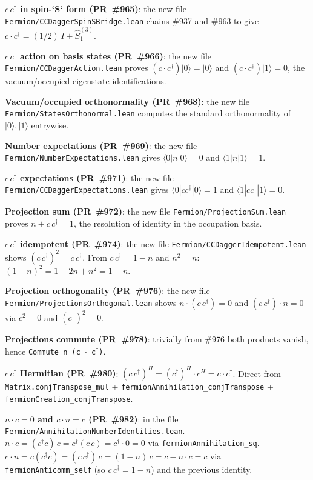 \documentclass[a4paper,11pt]{article}
\begin{document}
\textbf{$c\,c^\dagger$ in spin-`S` form (PR~\#965)}: the new file
\texttt{Fermion/CCDaggerSpinSBridge.lean} chains \#937 and \#963
to give $c\cdot c^\dagger = (1/2)\,I + \hat{S}^{(3)}_1$.

\textbf{$c\,c^\dagger$ action on basis states (PR~\#966)}: the new
file \texttt{Fermion/CCDaggerAction.lean} proves
$(c\cdot c^\dagger) |0\rangle = |0\rangle$ and
$(c\cdot c^\dagger) |1\rangle = 0$, the vacuum/occupied eigenstate
identifications.

\textbf{Vacuum/occupied orthonormality (PR~\#968)}: the new file
\texttt{Fermion/StatesOrthonormal.lean} computes the standard
orthonormality of $|0\rangle, |1\rangle$ entrywise.

\textbf{Number expectations (PR~\#969)}: the new file
\texttt{Fermion/NumberExpectations.lean} gives $\langle 0| n |0\rangle = 0$
and $\langle 1| n |1\rangle = 1$.

\textbf{$c\,c^\dagger$ expectations (PR~\#971)}: the new file
\texttt{Fermion/CCDaggerExpectations.lean} gives
$\langle 0| c c^\dagger |0\rangle = 1$ and
$\langle 1| c c^\dagger |1\rangle = 0$.

\textbf{Projection sum (PR~\#972)}: the new file
\texttt{Fermion/ProjectionSum.lean} proves
$n + c\,c^\dagger = 1$, the resolution of identity in the
occupation basis.

\textbf{$c\,c^\dagger$ idempotent (PR~\#974)}: the new file
\texttt{Fermion/CCDaggerIdempotent.lean} shows
$(c\,c^\dagger)^2 = c\,c^\dagger$. From $c\,c^\dagger = 1 - n$
and $n^2 = n$: $(1-n)^2 = 1 - 2n + n^2 = 1 - n$.

\textbf{Projection orthogonality (PR~\#976)}: the new file
\texttt{Fermion/ProjectionsOrthogonal.lean} shows
$n \cdot (c\,c^\dagger) = 0$ and $(c\,c^\dagger) \cdot n = 0$ via
$c^2 = 0$ and $(c^\dagger)^2 = 0$.

\textbf{Projections commute (PR~\#978)}: trivially from \#976
both products vanish, hence \texttt{Commute n (c $\cdot$ c$^\dagger$)}.

\textbf{$c\,c^\dagger$ Hermitian (PR~\#980)}: $(c\,c^\dagger)^H =
(c^\dagger)^H \cdot c^H = c \cdot c^\dagger$. Direct from
\texttt{Matrix.conjTranspose\_mul} +
\texttt{fermionAnnihilation\_conjTranspose} +
\texttt{fermionCreation\_conjTranspose}.

\textbf{$n\cdot c = 0$ and $c\cdot n = c$ (PR~\#982)}: in the file
\texttt{Fermion/AnnihilationNumberIdentities.lean}.
$n\cdot c = (c^\dagger c)\,c = c^\dagger(c\,c) = c^\dagger\cdot 0 = 0$
via \texttt{fermionAnnihilation\_sq}.
$c\cdot n = c(c^\dagger c) = (c\,c^\dagger)\,c = (1-n)\,c
 = c - n\cdot c = c$
via \texttt{fermionAnticomm\_self} (so $c\,c^\dagger = 1 - n$) and
the previous identity.
\end{document}
